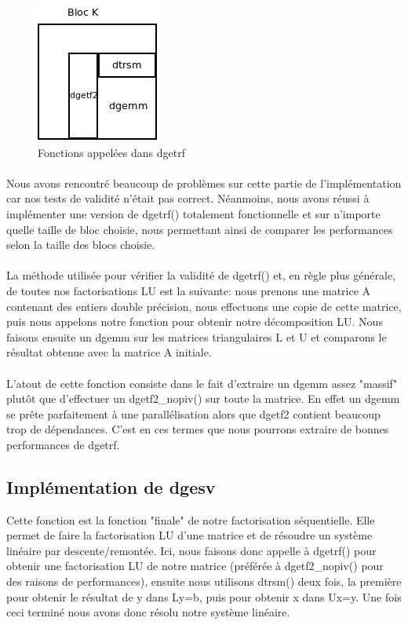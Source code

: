 \documentclass{article}
\begin{document}
\begin{figure}[!ht]
  \centering
  \includegraphics[scale=0.5]{pictures/Diagramme_dgetrf.jpeg}
  \caption{\label{diag:dgetrf} Fonctions appelées dans dgetrf}
\end{figure}

\paragraph{}Nous avons rencontré beaucoup de problèmes sur cette partie de l'implémentation car nos tests de validité n'était pas correct. Néanmoins, nous avons réussi à implémenter une version de dgetrf() totalement fonctionnelle et sur n'importe quelle taille de bloc choisie, nous permettant ainsi de comparer les performances selon la taille des blocs choisie.

\paragraph{}La méthode utilisée pour vérifier la validité de dgetrf() et, en règle plus générale, de toutes nos factorisations LU est la suivante: nous prenons une matrice A contenant des entiers double précision, nous effectuons une copie de cette matrice, puis nous appelons notre fonction pour obtenir notre décomposition LU. Nous faisons ensuite un dgemm sur les matrices triangulaires L et U et comparons le résultat obtenue avec la matrice A initiale.

\paragraph{}L'atout de cette fonction consiste dans le fait d'extraire un dgemm assez "massif" plutôt que d'effectuer un dgetf2\_nopiv() sur toute la matrice. En effet un dgemm se prête parfaitement à une parallélisation alors que dgetf2 contient beaucoup trop de dépendances. C'est en ces termes que nous pourrons extraire de bonnes performances de dgetrf.

\subsection{Implémentation de dgesv}Cette fonction est la fonction "finale" de notre factorisation séquentielle. Elle permet de faire la factorisation LU d'une matrice et de résoudre un système linéaire par descente/remontée. Ici, nous faisons donc appelle à dgetrf() pour obtenir une factorisation LU de notre matrice (préférée à dgetf2\_nopiv() pour des raisons de performances), ensuite nous utilisons dtrsm() deux fois, la première pour obtenir le résultat de y dans Ly=b, puis pour obtenir x dans Ux=y. Une fois ceci terminé nous avons donc résolu notre système linéaire.
\end{document}
